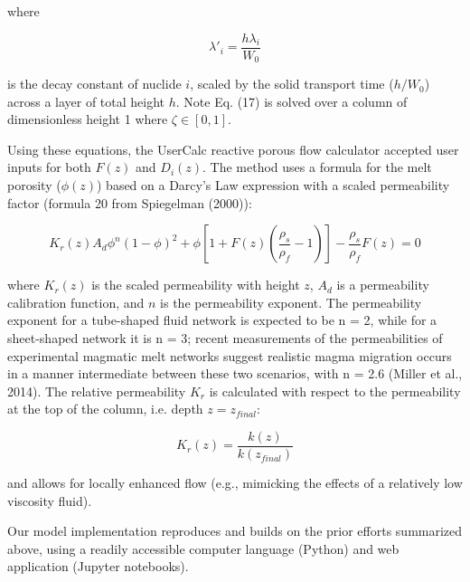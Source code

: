 \documentclass[draft]{agujournal2019}
\begin{document}
where

\begin{linenomath*}
\begin{equation}
    \lambda'_i = \frac{h\lambda_i}{W_0}\label{eq:18}
\end{equation}
\end{linenomath*}

is the decay constant of nuclide $i$, scaled by the solid transport time ($h/W_0$) across a layer of total height $h$. Note Eq. (17) is solved over a column of dimensionless height 1 where $\zeta\in[0,1]$.

Using these equations, the UserCalc reactive porous flow calculator accepted user inputs for both $F(z)$ and $D_i(z)$. The method uses a formula for the melt porosity ($\phi(z)$) based on a Darcy's Law expression with a scaled permeability factor (formula 20 from Spiegelman (2000)):

\begin{linenomath*}
\begin{equation}
    K_r(z)A_d \phi^n (1-\phi)^2 + \phi [1 + F(z) (\frac{\rho_s}{\rho_f} - 1)] - \frac{\rho_s}{\rho_f}F(z) = 0\label{eq:19}
\end{equation}
\end{linenomath*}

where $K_r(z)$ is the scaled permeability with height $z$, $A_d$ is a permeability calibration function, and $n$ is the permeability exponent. The permeability exponent for a tube-shaped fluid network is expected to be n = 2, while for a sheet-shaped network it is n = 3; recent measurements of the permeabilities of experimental magmatic melt networks suggest realistic magma migration occurs in a manner intermediate between these two scenarios, with n = 2.6 (Miller et al., 2014). The relative permeability $K_r$ is calculated with respect to the permeability at the top of the column, i.e. depth $z=z_{final}$:

\begin{linenomath*}
\begin{equation}
K_r(z) = \frac{k(z)}{k(z_{final})}\label{eq:20}
\end{equation}
\end{linenomath*}

and allows for locally enhanced flow (e.g., mimicking the effects of a relatively low viscosity fluid).

Our model implementation reproduces and builds on the prior efforts summarized above, using a readily accessible computer language (Python) and web application (Jupyter notebooks).
\end{document}
